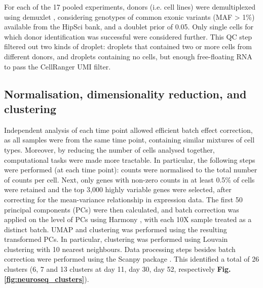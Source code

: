 For each of the 17 pooled experiments, donors (i.e. cell lines) were demultiplexed using demuxlet \cite{kang2018multiplexed}, considering genotypes of common exonic variants (MAF > 1\%) available from the HipSci bank, and a doublet prior of 0.05. 
Only single cells for which donor identification was successful were considered further. 
This QC step filtered out two kinds of droplet: droplets that contained two or more cells from different donors, and droplets containing no cells, but 
enough
free-floating RNA 
to pass
the CellRanger UMI filter.

\subsection{Normalisation, dimensionality reduction, and clustering}


Independent analysis of each time point allowed efficient batch effect correction, as all samples were from the same time point, containing similar mixtures of cell types.
Moreover, by reducing the number of cells analysed together, computational tasks were made more tractable.
In particular, the following steps were performed (at each time point): counts were normalised to the total number of counts per cell. 
Next, only genes with non-zero counts in at least 0.5\% of cells were retained and the top 3,000 highly variable genes were selected, after correcting for the mean-variance relationship in expression data. 
The first 50 principal components (PCs) were then calculated, and
batch correction was applied on the level of PCs using Harmony \cite{korsunsky2019fast}, with each 10X sample treated as a distinct batch. 
UMAP and clustering was performed using the resulting transformed PCs. 
In particular, clustering was performed using Louvain clustering \cite{blondel2008fast} with 10 nearest neighbours. 
Data processing steps besides batch correction were performed using the Scanpy package \cite{wolf2018scanpy}. 
This identified a total of 26 clusters (6, 7 and 13 clusters at day 11, day 30, day 52, respectively \textbf{Fig. \ref{fig:neuroseq_clusters}}). \\

